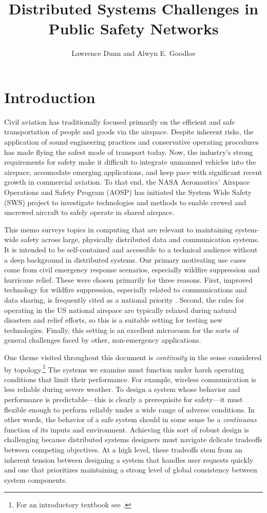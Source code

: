 \documentclass[]             %
{NASA}                       %
\title{Distributed Systems Challenges in Public Safety Networks}
\author{Lawrence Dunn and Alwyn E. Goodloe}
\theoremstyle{definition}
\begin{document}
\newpage
\setcounter{tocdepth}{2}
\tableofcontents
\newpage

\section{Introduction}
\label{sec:introduction}
Civil aviation has traditionally focused primarily on the efficient
and safe transportation of people and goods via the airspace. Despite
inherent risks, the application of sound engineering practices and
conservative operating procedures has made flying the safest mode of
transport today. Now, the industry's strong requirements for safety
make it difficult to integrate unmanned vehicles into the airspace,
accomodate emerging applications, and keep pace with significant
recent growth in commercial aviation. To that end, the NASA
Aeronautics' Airspace Operations and Safety Program (AOSP) has
initiated the System Wide Safety (SWS) project to investigate
technologies and methods to enable crewed and uncrewed aircraft to
safely operate in shared airspace.

This memo surveys topics in computing that are relevant to maintaining
system-wide safety across large, physically distributed data and
communication systems. It is intended to be self-contained and
accessible to a technical audience without a deep background in
distributed systems. Our primary motivating use cases come from civil
emergency response scenarios, especially wildfire suppression and
hurricane relief. These were chosen primarily for three
reasons. First, improved technology for wildfire suppression,
especially related to communications and data sharing, is frequently
cited as a national priority \cite{pcast2023}.  Second, the rules for
operating in the US national airspace are typically relaxed during
natural disasters and relief efforts, so this is a suitable setting
for testing new technologies. Finally, this setting is an excellent
microcosm for the sorts of general challenges faced by other,
non-emergency applications.

One theme visited throughout this document is \emph{continuity} in the sense
considered by topology.\footnote{For an introductory textbook see
  \cite{mendelson2012introduction}.}  The systems we examine must
function under harsh operating conditions that limit their
performance. For example, wireless communication is less reliable
during severe weather. To design a system whose behavior and
performance is predictable---this is clearly a prerequisite for
safety---it must flexible enough to perform reliably under a wide
range of adverse conditions. In other words, the behavior of a safe
system should in some sense be a \emph{continuous} function of its
inputs and environment. Achieving this sort of robust design is
challenging because distributed systems designers must navigate
delicate tradeoffs between competing objectives. At a high level,
these tradeoffs stem from an inherent tension between designing a
system that handles user requests quickly and one that prioritizes
maintaining a strong level of global consistency between system
components.
\end{document}
